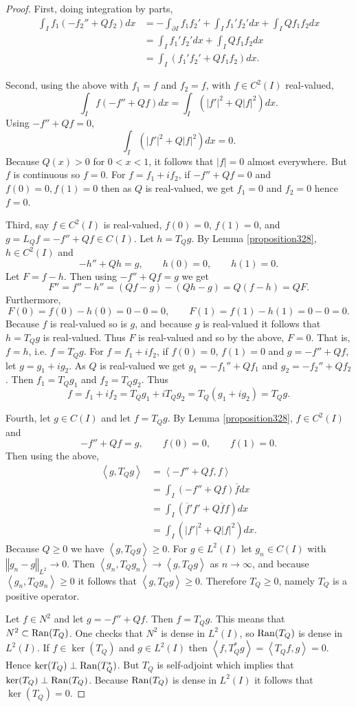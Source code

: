 \documentclass{article}
\newcommand{\inner}[2]{\left\langle #1, #2 \right\rangle}
\newcommand{\Ran}{\ensuremath\mathrm{Ran}}
\newcommand{\norm}[1]{\left\Vert #1 \right\Vert}
\theoremstyle{definition}
\begin{document}
\begin{proof}
First, doing integration by parts,
\begin{align*}
\int_I f_1(-f_2''+Qf_2)dx&=-\int_{\partial I} f_1f_2'
+\int_I f_1'f_2' dx
+\int_I Qf_1f_2 dx\\
&=\int_I f_1'f_2' dx
+\int_I Qf_1f_2 dx\\
&=\int_I (f_1'f_2'+Qf_1f_2) dx.
\end{align*}

Second, using the above with $f_1=f$ and $f_2=f$, with $f \in C^2(I)$ real-valued,
\[
\int_I f(-f''+Qf) dx = \int_I (|f'|^2+Q|f|^2) dx.
\]
Using $-f''+Qf=0$,
\[
 \int_I (|f'|^2+Q|f|^2) dx=0.
\]
Because $Q(x)>0$ for $0<x<1$, it follows that $|f|=0$ almost everywhere.
But $f$ is continuous so $f=0$. For $f=f_1+if_2$, if
$-f''+Qf=0$ and $f(0)=0, f(1)=0$ then as $Q$ is real-valued,
we get $f_1=0$ and $f_2=0$ hence $f=0$.

Third, say $f \in C^2(I)$ is real-valued, $f(0)=0$, $f(1)=0$, and 
$g=L_Qf=-f''+Qf \in C(I)$.
Let $h=T_Qg$. By Lemma \ref{proposition328}, $h \in C^2(I)$ and 
\[
-h''+Qh=g,\qquad h(0)=0,\qquad h(1)=0.
\]
Let $F=f-h$. Then using $-f''+Qf=g$ we get
\[
F''=f''-h''=(Qf-g)-(Qh-g)=Q(f-h)=QF.
\]
Furthermore,
\[
F(0)=f(0)-h(0)=0-0=0,\qquad F(1)=f(1)-h(1)=0-0=0.
\]
Because $f$ is real-valued so is $g$, and because $g$ is real-valued
it follows that $h=T_Q g$ is real-valued. Thus $F$ is real-valued and so by the above,
$F=0$. That is, 
$f=h$, i.e.
$f=T_Qg$. For $f=f_1+if_2$, if $f(0)=0$, $f(1)=0$ and
$g=-f''+Qf$, let $g=g_1+ig_2$.
As $Q$ is real-valued we get
$g_1=-f_1''+Qf_1$ and $g_2=-f_2''+Qf_2$. Then
$f_1=T_Q g_1$ and $f_2=T_Qg_2$. Thus
\[
f=f_1+if_2=T_Qg_1+iT_Qg_2=T_Q(g_1+ig_2)=T_Qg.
\]


Fourth, let $g \in C(I)$ and let $f=T_Qg$. By Lemma \ref{proposition328},
$f \in C^2(I)$ and
\[
-f''+Qf=g,\qquad f(0)=0,\qquad f(1)=0.
\]
Then using the above,
\begin{align*}
\inner{g}{T_Qg}&=\inner{-f''+Qf}{f}\\
&=\int_I (-f''+Qf)\overline{f} dx\\
&=\int_I (\overline{f}'f'+Q\overline{f}f)dx\\
&=\int_I (|f'|^2+Q|f|^2) dx.
\end{align*}
Because $Q \geq 0$ we have $\inner{g}{T_Qg} \geq 0$.
For $g \in L^2(I)$ let $g_n \in C(I)$ with $\norm{g_n-g}_{L^2} \to 0$. 
Then $\inner{g_n}{T_Q g_n} \to \inner{g}{T_Q g}$ as $n \to \infty$, and because
$\inner{g_n}{T_Q g_n} \geq 0$ it follows that $\inner{g}{T_Q g} \geq 0$. 
Therefore $T_Q \geq 0$, namely $T_Q$ is a positive operator.

Let $f \in N^2$ and
let $g=-f''+Qf$. Then $f=T_Qg$. This means that 
$N^2 \subset \Ran(T_Q)$. One checks that $N^2$ is dense in $L^2(I)$, so $\Ran(T_Q)$ is dense in 
$L^2(I)$. 
If $f \in \ker(T_Q)$ and $g \in L^2(I)$ then 
$\inner{f}{T_Q^*g}=\inner{T_Qf}{g}=0$. Hence
$\ker(T_Q) \perp \Ran(T_Q^*)$. But $T_Q$ is self-adjoint which implies that
$\ker(T_Q) \perp \Ran(T_Q)$. 
Because $\Ran(T_Q)$ is dense in $L^2(I)$ it follows that $\ker(T_Q)=0$.
\end{proof}
\end{document}

